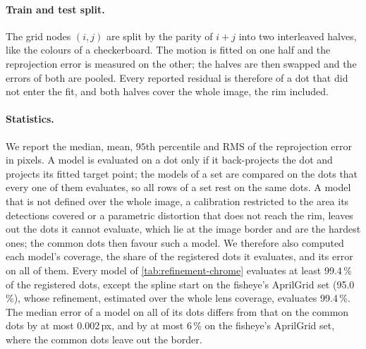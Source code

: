 \paragraph{Train and test split.}
The grid nodes $(i,j)$ are split by the parity of $i+j$ into two interleaved halves, like the colours of a checkerboard. The motion is fitted on one half and the reprojection error is measured on the other; the halves are then swapped and the errors of both are pooled. Every reported residual is therefore of a dot that did not enter the fit, and both halves cover the whole image, the rim included.

\paragraph{Statistics.}
We report the median, mean, $95$th percentile and RMS of the reprojection error in pixels. A model is evaluated on a dot only if it back-projects the dot and projects its fitted target point; the models of a set are compared on the dots that every one of them evaluates, so all rows of a set rest on the same dots.
A model that is not defined over the whole image, \eg a calibration restricted to the area its detections covered or a parametric distortion that does not reach the rim, leaves out the dots it cannot evaluate, which lie at the image border and are the hardest ones; the common dots then favour such a model. We therefore also computed each model's coverage, the share of the registered dots it evaluates, and its error on all of them. Every model of \cref{tab:refinement-chrome} evaluates at least 99.4\,\% of the registered dots, except the spline start on the fisheye's AprilGrid set (95.0\,\%), whose refinement, estimated over the whole lens coverage, evaluates 99.4\,\%. The median error of a model on all of its dots differs from that on the common dots by at most 0.002\,px, and by at most 6\,\% on the fisheye's AprilGrid set, where the common dots leave out the border.

